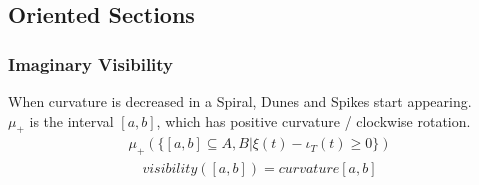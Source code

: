 \documentclass{article}
\begin{document}
\subsection{Oriented Sections}

\subsubsection{Imaginary Visibility}
When curvature is decreased in a Spiral, Dunes and Spikes start appearing.\\
$\mu_{+}$ is the interval $[a,b]$, which has positive curvature / clockwise rotation.
\begin{align}
\mu_{+}(\{[a,b] \subseteq A,B \vert \xi(t) -\iota_{T}(t)\geq0\})
\end{align}
\begin{align}
visibility([a,b])=curvature[a,b]
\end{align}
\end{document}
